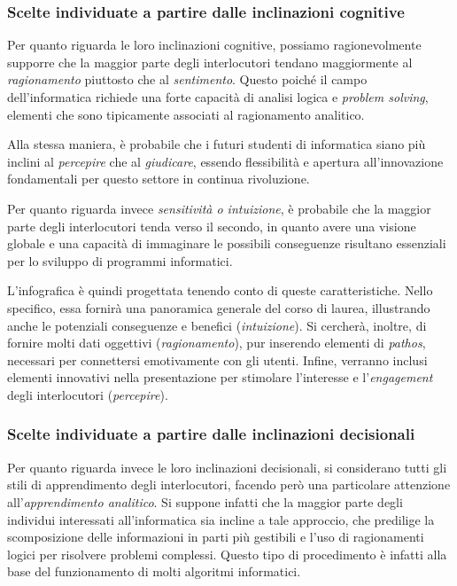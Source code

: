 \subsubsection{Scelte individuate a partire dalle inclinazioni cognitive}
Per quanto riguarda le loro inclinazioni cognitive, possiamo ragionevolmente supporre che la maggior parte degli interlocutori tendano maggiormente al \emph{ragionamento} piuttosto che al \emph{sentimento}. 
Questo poiché il campo dell'informatica richiede una forte capacità di analisi logica e \emph{problem solving}, elementi che sono tipicamente associati al ragionamento analitico. 

Alla stessa maniera, è probabile che i futuri studenti di informatica siano più inclini al \emph{percepire} che al \emph{giudicare}, essendo flessibilità e apertura all'innovazione fondamentali per questo settore 
in continua rivoluzione. 

Per quanto riguarda invece \emph{sensitività o intuizione}, è probabile che la maggior parte degli interlocutori tenda verso il secondo, in quanto avere una visione globale e una capacità di immaginare le possibili conseguenze 
risultano essenziali per lo sviluppo di programmi informatici.

\bigskip
\noindent L'infografica è quindi progettata tenendo conto di queste caratteristiche. Nello specifico, essa fornirà una panoramica generale del corso di laurea, illustrando anche le potenziali conseguenze e benefici (\emph{intuizione}). Si cercherà, inoltre, 
di fornire molti dati oggettivi (\emph{ragionamento}), pur inserendo elementi di \emph{pathos}, necessari per connettersi emotivamente con gli utenti. Infine, verranno inclusi elementi innovativi nella presentazione per stimolare l'interesse e 
l'\emph{engagement} degli interlocutori (\emph{percepire}).

\subsubsection{Scelte individuate a partire dalle inclinazioni decisionali}
Per quanto riguarda invece le loro inclinazioni decisionali, si considerano tutti gli stili di apprendimento degli interlocutori, facendo però una particolare attenzione all'\emph{apprendimento analitico}. Si suppone infatti che la 
maggior parte degli individui interessati all'informatica sia incline a tale approccio, che predilige la scomposizione delle informazioni in parti più gestibili e l'uso di ragionamenti logici per risolvere problemi complessi. Questo tipo di
procedimento è infatti alla base del funzionamento di molti algoritmi informatici.

